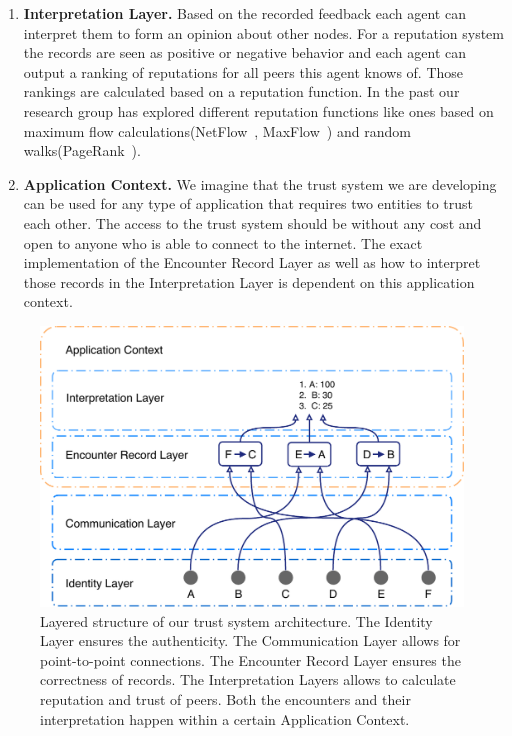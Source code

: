 \begin{enumerate}
    \item \textbf{Interpretation Layer.} Based on the recorded feedback each agent can interpret them
    to form an opinion about other nodes. For a reputation system the records are seen as positive or
    negative behavior and each agent can output a ranking of reputations for all peers this agent knows
    of. Those rankings are calculated based on a reputation function. In the past our research group has
    explored different reputation functions like ones based on maximum flow calculations(NetFlow~\cite{OTTE2017}, 
    MaxFlow~\cite{meulpolder2009bartercast}) and random walks(PageRank~\cite{page1999pagerank}).

    \item \textbf{Application Context.} We imagine that the trust system we are developing can be used 
    for any type of application that requires two entities to trust each other. The access to the trust
    system should be without any cost and open to anyone who is able to connect to the internet. 
    The exact implementation of the Encounter Record Layer as well as how to interpret those records
    in the Interpretation Layer is dependent on this application context.
\end{enumerate}

\begin{figure}[h]
    \centering
    \includegraphics[width=\textwidth]{images/layers_of_trust_systems.pdf}
    \caption{Layered structure of our trust system architecture. The Identity Layer ensures the authenticity.
    The Communication Layer allows for point-to-point connections. The Encounter Record Layer ensures 
    the correctness of records. The Interpretation Layers allows to calculate reputation and trust of 
    peers. Both the encounters and their interpretation happen within a certain Application Context.}
    \label{fig:layers_of_trust_system}
\end{figure}

